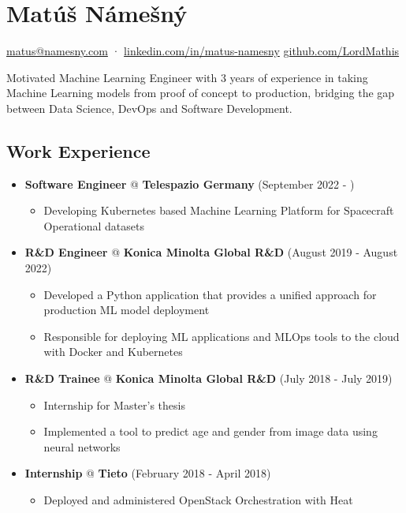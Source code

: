 \documentclass[a4,12pt]{article}
\begin{document}
\section*{Matúš Námešný}

\begin{center}
\href{mailto:matus@namesny.com}{matus@namesny.com} · 
\href{https://www.linkedin.com/in/matus-namesny/}{linkedin.com/in/matus-namesny}
\href{https://www.github.com/LordMathis}{github.com/LordMathis}
\end{center}

 Motivated Machine Learning Engineer with 3 years of experience in taking Machine Learning models from proof of concept to production, bridging the gap between Data Science, DevOps and Software Development.


\subsection*{Work Experience}\label{work}

\begin{itemize}
\item
  \textbf{Software Engineer} @ \textbf{Telespazio Germany} \hfill (September 2022 - )
  \begin{itemize}
      \item Developing Kubernetes based Machine Learning Platform for Spacecraft Operational datasets
  \end{itemize}
\item
  \textbf{R\&D Engineer} @ \textbf{Konica Minolta Global R\&D} \hfill (August 2019 - August 2022)
  \begin{itemize}
      \item Developed a Python application that provides a unified approach for production ML model deployment
      \item Responsible for deploying ML applications and MLOps tools to the cloud with Docker and Kubernetes
  \end{itemize}
\item
  \textbf{R\&D Trainee} @ \textbf{Konica Minolta Global R\&D} \hfill (July 2018 - July 2019)
  \begin{itemize}
      \item Internship for Master's thesis
      \item Implemented a tool to predict age and gender from image data using neural networks
  \end{itemize}
\item
  \textbf{Internship} @ \textbf{Tieto} \hfill (February 2018 - April 2018)
  \begin{itemize}
      \item Deployed and administered OpenStack Orchestration with Heat
  \end{itemize}
\end{itemize}
\end{document}
